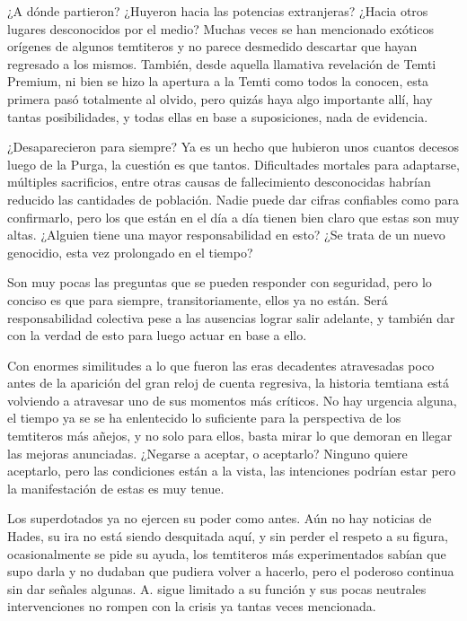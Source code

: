 \documentclass[
  spanish,
]{book}
\begin{document}
¿A dónde partieron? ¿Huyeron hacia las potencias extranjeras? ¿Hacia otros lugares desconocidos por el medio?
Muchas veces se han mencionado exóticos orígenes de algunos temtiteros y no parece desmedido descartar que hayan regresado a los mismos. También, desde aquella llamativa revelación de Temti Premium, ni bien se hizo la apertura a la Temti como todos la conocen, esta primera pasó totalmente al olvido, pero quizás haya algo importante allí, hay tantas posibilidades, y todas ellas en base a suposiciones, nada de evidencia.

¿Desaparecieron para siempre?
Ya es un hecho que hubieron unos cuantos decesos luego de la Purga, la cuestión es que tantos. Dificultades mortales para adaptarse, múltiples sacrificios, entre otras causas de fallecimiento desconocidas habrían reducido las cantidades de población. Nadie puede dar cifras confiables como para confirmarlo, pero los que están en el día a día tienen bien claro que estas son muy altas. ¿Alguien tiene una mayor responsabilidad en esto? ¿Se trata de un nuevo genocidio, esta vez prolongado en el tiempo?

Son muy pocas las preguntas que se pueden responder con seguridad, pero lo conciso es que para siempre, transitoriamente, ellos ya no están. Será responsabilidad colectiva pese a las ausencias lograr salir adelante, y también dar con la verdad de esto para luego actuar en base a ello.

Con enormes similitudes a lo que fueron las eras decadentes atravesadas poco antes de la aparición del gran reloj de cuenta regresiva, la historia temtiana está volviendo a atravesar uno de sus momentos más críticos.
No hay urgencia alguna, el tiempo ya se se ha enlentecido lo suficiente para la perspectiva de los temtiteros más añejos, y no solo para ellos, basta mirar lo que demoran en llegar las mejoras anunciadas. ¿Negarse a aceptar, o aceptarlo? Ninguno quiere aceptarlo, pero las condiciones están a la vista, las intenciones podrían estar pero la manifestación de estas es muy tenue.

Los superdotados ya no ejercen su poder como antes. Aún no hay noticias de Hades, su ira no está siendo desquitada aquí, y sin perder el respeto a su figura, ocasionalmente se pide su ayuda, los temtiteros más experimentados sabían que supo darla y no dudaban que pudiera volver a hacerlo, pero el poderoso continua sin dar señales algunas. A. sigue limitado a su función y sus pocas neutrales intervenciones no rompen con la crisis ya tantas veces mencionada.
\end{document}
